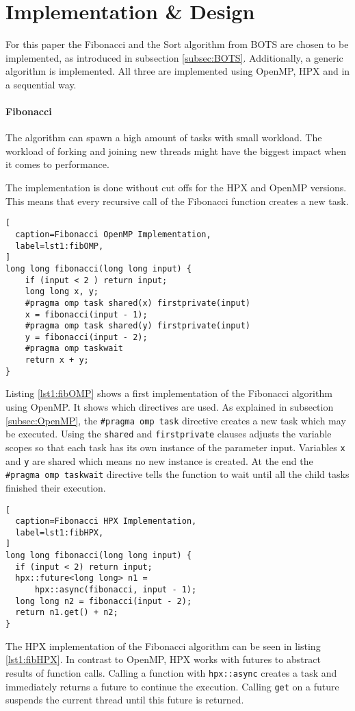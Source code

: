 \section{Implementation \& Design}
\label{sec:implem}
  For this paper the Fibonacci and the Sort algorithm from BOTS are chosen to be implemented, as introduced in subsection \ref{subsec:BOTS}.
  Additionally, a generic algorithm is implemented.
  All three are implemented using OpenMP, HPX and in a sequential way.
  
  \paragraph{Fibonacci}
  The algorithm can spawn a high amount of tasks with small workload.
  The workload of forking and joining new threads might have the biggest impact when it comes to performance.
  
  The implementation is done without cut offs for the HPX and OpenMP versions.
  This means that every recursive call of the Fibonacci function creates a new task.
  \begin{lstlisting}[
  caption=Fibonacci OpenMP Implementation,
  label=lst1:fibOMP,
]
long long fibonacci(long long input) {
    if (input < 2 ) return input;
    long long x, y;
    #pragma omp task shared(x) firstprivate(input)
    x = fibonacci(input - 1);
    #pragma omp task shared(y) firstprivate(input)
    y = fibonacci(input - 2);
    #pragma omp taskwait
    return x + y;
}
\end{lstlisting}
  Listing \ref{lst1:fibOMP} shows a first implementation of the Fibonacci algorithm using OpenMP.
  It shows which directives are used.
  As explained in subsection \ref{subsec:OpenMP}, the \texttt{\#pragma omp task} directive creates a new task which may be executed.
  Using the \texttt{shared} and \texttt{firstprivate} clauses adjusts the variable scopes so that each task has its own instance of the parameter input.
  Variables \texttt{x} and \texttt{y} are shared which means no new instance is created.
  At the end the \texttt{\#pragma omp taskwait} directive tells the function to wait until all the child tasks finished their execution.
  
\begin{lstlisting}[
  caption=Fibonacci HPX Implementation,
  label=lst1:fibHPX,
]
long long fibonacci(long long input) {
  if (input < 2) return input;
  hpx::future<long long> n1 =
      hpx::async(fibonacci, input - 1);
  long long n2 = fibonacci(input - 2);
  return n1.get() + n2;
}
\end{lstlisting}
  The HPX implementation of the Fibonacci algorithm can be seen in listing \ref{lst1:fibHPX}.
  In contrast to OpenMP, HPX works with futures to abstract results of function calls.
  Calling a function with \texttt{hpx::async} creates a task and immediately returns a future to continue the execution.
  Calling \texttt{get} on a future suspends the current thread until this future is returned.
  \\
 
